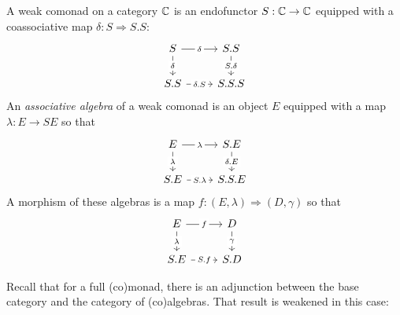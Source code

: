 \begin{definition}
  A weak comonad on a category $\mathbb{C}$ is an endofunctor $S: \mathbb{C} \to \mathbb{C}$ equipped with a coassociative map $\delta:S \Rightarrow S.S$:
  \[\begin{tikzcd}
    S & {S.S} \\
    {S.S} & {S.S.S}
    \arrow["\delta"{description}, from=1-1, to=1-2]
    \arrow["\delta"{description}, from=1-1, to=2-1]
    \arrow["{S.\delta}"{description}, from=1-2, to=2-2]
    \arrow["{\delta.S}"{description}, from=2-1, to=2-2]
  \end{tikzcd}\]
  An \emph{associative algebra} of a weak comonad is an object $E$ equipped with a map $\lambda:E \to SE$ so that
  \[\begin{tikzcd}
    E & {S.E} \\
    {S.E} & {S.S.E}
    \arrow["\lambda"{description}, from=1-1, to=1-2]
    \arrow["\lambda"{description}, from=1-1, to=2-1]
    \arrow["{\delta.E}"{description}, from=1-2, to=2-2]
    \arrow["{S.\lambda}"{description}, from=2-1, to=2-2]
  \end{tikzcd}\]
  A morphism of these algebras is a map $f:(E,\lambda) \Rightarrow (D,\gamma)$ so that
  \[\begin{tikzcd}
    E & D \\
    S.E & S.D
    \arrow["f"{description}, from=1-1, to=1-2]
    \arrow["{S.f}"{description}, from=2-1, to=2-2]
    \arrow["\lambda"{description}, from=1-1, to=2-1]
    \arrow["\gamma"{description}, from=1-2, to=2-2]
  \end{tikzcd}\]
\end{definition}
Recall that for a full (co)monad, there is an adjunction between the base category and the category of (co)algebras. That result is weakened in this case: 
